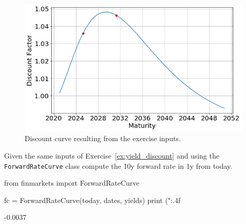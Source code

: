 \begin{solution}
\begin{figure}[htpb]
\centering
\includegraphics[width=0.7\linewidth]{figures/ex_discount}
\caption{Discount curve resulting from the exercise inputs.}
\label{fig:ex_discount}
\end{figure}
\end{solution}

%
%


\begin{question}
Given the same inputs of Exercise~\ref{ex:yield_discount} and using the \texttt{ForwardRateCurve} class compute the 10y forward rate in 1y from today. 
\end{question}

\cprotEnv\begin{solution}
\begin{ipython}
from finmarkets import ForwardRateCurve

fc = ForwardRateCurve(today, dates, yields)
print ("{:.4f}%
\end{ipython}
\begin{ioutput}
-0.0037%
\end{ioutput}
\end{solution}

